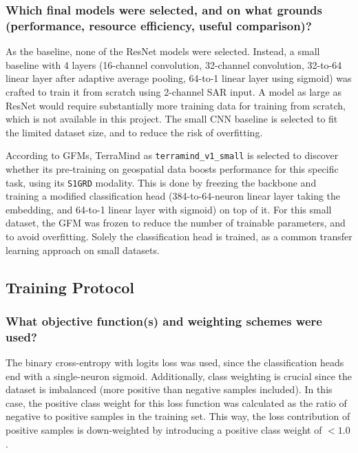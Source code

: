 \documentclass[sigconf]{acmart}
\begin{document}
\subsubsection{Which final models were selected, and on what grounds (performance, resource efficiency, useful comparison)?} As the baseline, none of the ResNet models were selected. Instead, a small baseline with 4 layers (16-channel convolution, 32-channel convolution, 32-to-64 linear layer after adaptive average pooling, 64-to-1 linear layer using sigmoid) was crafted to train it from scratch using 2-channel SAR input. A model as large as ResNet would require substantially more training data for training from scratch, which is not available in this project. The small CNN baseline is selected to fit the limited dataset size, and to reduce the risk of overfitting.

According to GFMs, TerraMind \cite{11445875} as \texttt{terramind\_v1\_small} is selected to discover whether its pre-training on geospatial data boosts performance for this specific task, using its \texttt{S1GRD} modality. This is done by freezing the backbone and training a modified classification head (384-to-64-neuron linear layer taking the embedding, and 64-to-1 linear layer with sigmoid) on top of it. For this small dataset, the GFM was frozen to reduce the number of trainable parameters, and to avoid overfitting. Solely the classification head is trained, as a common transfer learning approach on small datasets.

\subsection{Training Protocol}
\subsubsection{What objective function(s) and weighting schemes were used?} The binary cross-entropy with logits loss was used, since the classification heads end with a single-neuron sigmoid. Additionally, class weighting is crucial since the dataset is imbalanced (more positive than negative samples included). In this case, the positive class weight for this loss function was calculated as the ratio of negative to positive samples in the training set. This way, the loss contribution of positive samples is down-weighted by introducing a positive class weight of $<1.0$.
\end{document}
